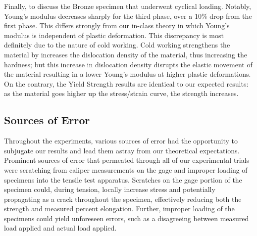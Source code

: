 \documentclass{article}
\begin{document}
Finally, to discuss the Bronze specimen that underwent cyclical loading. Notably, Young's modulus decreases sharply for the third phase, over a 10\% drop from the first phase. This differs strongly from our in-class theory in which Young's modulus is independent of plastic deformation. This discrepancy is most definitely due to the nature of cold working. Cold working strengthens the material by increases the dislocation density of the material, thus increasing the hardness; but this increase in dislocation density disrupts the elastic movement of the material resulting in a lower Young's modulus at higher plastic deformations. On the contrary, the Yield Strength results are identical to our expected results: as the material goes higher up the stress/strain curve, the strength increases. 

\subsection{Sources of Error}\label{sec:error}
Throughout the experiments, various sources of error had the opportunity to subjugate our results and lead them astray from our theoretical expectations. Prominent sources of error that permeated through all of our experimental trials were scratching from caliper measurements on the gage and improper loading of specimens into the tensile test apparatus. Scratches on the gage portion of the specimen could, during tension, locally increase stress and potentially propagating as a crack throughout the specimen, effectively reducing both the strength and measured percent elongation. Further, improper loading of the specimens could yield unforeseen errors, such as a disagreeing between measured load applied and actual load applied.  

\newpage
\end{document}
